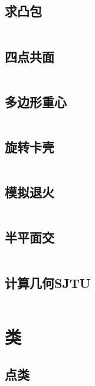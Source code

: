 \subsection{求凸包} 

\inputminted{cpp}{code/Graham.cc}

\subsection{四点共面} 

\inputminted{cpp}{code/fourPointPlane.cc}

\subsection{多边形重心} 

\inputminted{cpp}{code/polygonCore.cc}

\subsection{旋转卡壳} 

\inputminted{cpp}{code/RotatingJam.cc}

\subsection{模拟退火} 

\inputminted{cpp}{code/SimulatedAnnealing.cc}

\subsection{半平面交} 

\inputminted{cpp}{code/half_plane_inter_section.cc}

\subsection{计算几何SJTU} 

\inputminted{cpp}{code/SJTUgeometry.cc}

\section{类} 
\subsection{点类} 

\inputminted{cpp}{code/point.cc}

